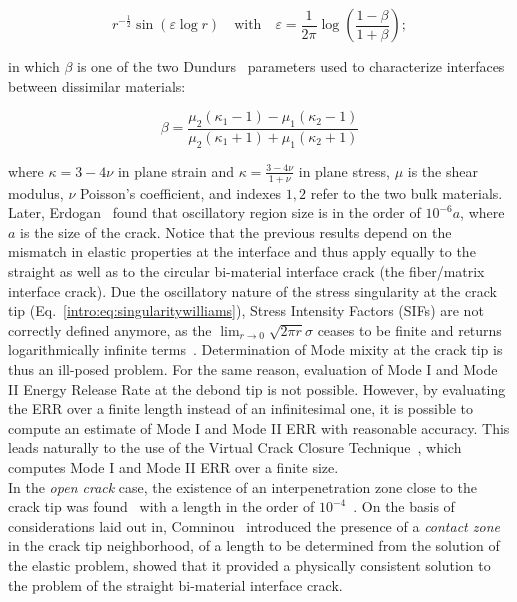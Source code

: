 \begin{equation}\label{intro:eq:singularitywilliams}
r^{-\frac{1}{2}}\sin\left(\varepsilon\log r\right)\quad\text{with}\quad\varepsilon=\frac{1}{2\pi}\log\left(\frac{1-\beta}{1+\beta}\right);
\end{equation}

in which $\beta$ is one of the two Dundurs~\cite{Dundurs1969} parameters used to characterize interfaces between dissimilar materials:

\begin{equation}\label{intro:eq:dundursbeta}
\beta=\frac{\mu_{2}\left(\kappa_{1}-1\right)-\mu_{1}\left(\kappa_{2}-1\right)}{\mu_{2}\left(\kappa_{1}+1\right)+\mu_{1}\left(\kappa_{2}+1\right)}
\end{equation}

where $\kappa=3-4\nu$ in plane strain and $\kappa=\frac{3-4\nu}{1+\nu}$ in plane stress, $\mu$ is the shear modulus, $\nu$ Poisson's coefficient, and indexes $1,2$ refer to the two bulk materials. Later, Erdogan~\cite{Erdogan1963} found that oscillatory region size is in the order of $10^{-6}a$, where $a$ is the size of the crack. Notice that the previous results depend on the mismatch in elastic properties at the interface and thus apply equally to the straight as well as to the circular bi-material interface crack (the fiber/matrix interface crack). Due the oscillatory nature of the stress singularity at the crack tip (Eq.~\ref{intro:eq:singularitywilliams}), Stress Intensity Factors (SIFs) are not correctly defined anymore, as the $\lim_{r\rightarrow 0}\sqrt{2\pi r}\sigma$ ceases to be finite and returns logarithmically infinite terms~\cite{Comninou1990}. Determination of Mode mixity at the crack tip is thus an ill-posed problem. For the same reason, evaluation of Mode I and Mode II Energy Release Rate at the debond tip is not possible. However, by evaluating the ERR over a finite length instead of an infinitesimal one, it is possible to compute an estimate of Mode I and Mode II ERR with reasonable accuracy. This leads naturally to the use of the Virtual Crack Closure Technique~\cite{Krueger2004}, which computes Mode I and Mode II ERR over a finite size.\\
In the \emph{open crack} case, the existence of an interpenetration zone close to the crack tip was found~\cite{England1965,Malyshev1965} with a length in the order of $10^{-4}$~\cite{England1965}. On the basis of considerations laid out in\cite{Malyshev1965}, Comninou~\cite{Comninou1977} introduced the presence of a \emph{contact zone} in the crack tip neighborhood, of a length to be determined from the solution of the elastic problem, showed that it provided a physically consistent solution to the problem of the straight bi-material interface crack.\\
